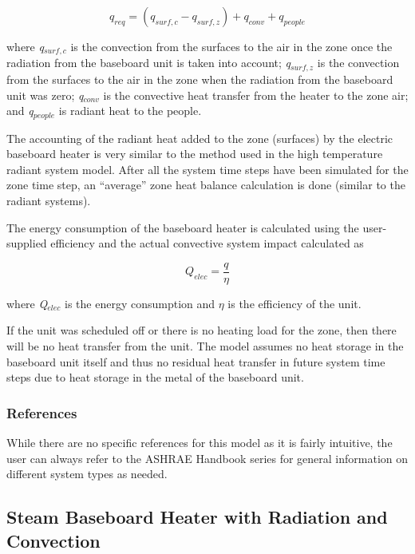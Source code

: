 \begin{equation}
{q_{req}} = ({q_{surf,c}} - {q_{surf,z}}) + {q_{conv}} + {q_{people}}
\end{equation}

where \emph{q\(_{surf,c}\)} is the convection from the surfaces to the air in the zone once the radiation from the baseboard unit is taken into account; \emph{q\(_{surf,z}\)} is the convection from the surfaces to the air in the zone when the radiation from the baseboard unit was zero; \emph{q\(_{conv}\)} is the convective heat transfer from the heater to the zone air; and \emph{q\(_{people}\)} is radiant heat to the people.

The accounting of the radiant heat added to the zone (surfaces) by the electric baseboard heater is very similar to the method used in the high temperature radiant system model. After all the system time steps have been simulated for the zone time step, an ``average'' zone heat balance calculation is done (similar to the radiant systems).

The energy consumption of the baseboard heater is calculated using the user-supplied efficiency and the actual convective system impact calculated as

\begin{equation}
{Q_{elec}} = \frac{q}{\eta }
\end{equation}

where \emph{Q\(_{elec}\)} is the energy consumption and \({\eta}\) is the efficiency of the unit.

If the unit was scheduled off or there is no heating load for the zone, then there will be no heat transfer from the unit. The model assumes no heat storage in the baseboard unit itself and thus no residual heat transfer in future system time steps due to heat storage in the metal of the baseboard unit.

\subsubsection{References}\label{references-020}

While there are no specific references for this model as it is fairly intuitive, the user can always refer to the ASHRAE Handbook series for general information on different system types as needed.

\subsection{Steam Baseboard Heater with Radiation and Convection}\label{steam-baseboard-heater-with-radiation-and-convection}

